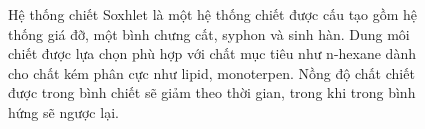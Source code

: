 \documentclass[
  twocolumn,
  landscape]{report}
\begin{document}
\begin{figure}


\caption{\label{fig-sohxlet}Hệ thống chiết Soxhlet là một hệ thống chiết
được cấu tạo gồm hệ thống giá đỡ, một bình chưng cất, syphon và sinh
hàn. Dung môi chiết được lựa chọn phù hợp với chất mục tiêu như n-hexane
dành cho chất kém phân cực như lipid, monoterpen. Nồng độ chất chiết
được trong bình chiết sẽ giảm theo thời gian, trong khi trong bình hứng
sẽ ngược lại.}

\end{figure}%
\end{document}
